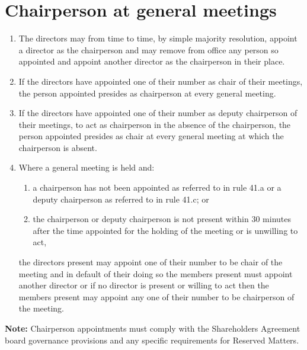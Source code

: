 \section{Chairperson at general meetings}

\begin{enumerate}[label=(\alph*)]
    \item The directors may from time to time, by simple majority resolution, appoint a director as the chairperson and may remove from office any person so appointed and appoint another director as the chairperson in their place.
    
    \item If the directors have appointed one of their number as chair of their meetings, the person appointed presides as chairperson at every general meeting.
    
    \item If the directors have appointed one of their number as deputy chairperson of their meetings, to act as chairperson in the absence of the chairperson, the person appointed presides as chair at every general meeting at which the chairperson is absent.
    
    \item Where a general meeting is held and:
    \begin{enumerate}[label=(\roman*)]
        \item a chairperson has not been appointed as referred to in rule 41.a or a deputy chairperson as referred to in rule 41.c; or
        \item the chairperson or deputy chairperson is not present within 30 minutes after the time appointed for the holding of the meeting or is unwilling to act,
    \end{enumerate}
    
    the directors present may appoint one of their number to be chair of the meeting and in default of their doing so the members present must appoint another director or if no director is present or willing to act then the members present may appoint any one of their number to be chairperson of the meeting.
\end{enumerate}

\textbf{Note:} Chairperson appointments must comply with the Shareholders Agreement board governance provisions and any specific requirements for Reserved Matters. 